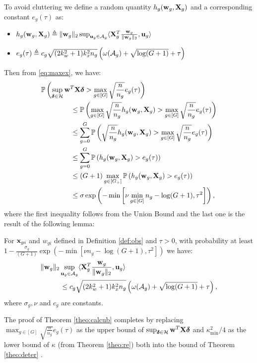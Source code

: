 To avoid cluttering we define a random quantity $h_g(\mathbf{w}_g, \mathbf{X}_g)$ and a corresponding constant $e_g(\tau)$ as: 
{\small\begin{itemize}
	\item $h_g(\w_g, \X_g) \triangleq   \norm{\w_g}{2}  \sup_{\u_g \in \cA_g} \langle \X_g^T \frac{\w_g}{\norm{\w_g}{2}}, \u_g \rangle $
	\item $e_g(\tau) \triangleq  c_g\sqrt{(2k_w^2 + 1)k_x^2n_g} \left(\omega(\cA_g) + \sqrt{\log (G+1)} + \tau \right)$
\end{itemize}}
Then from \eqref{eq:maxex}, we have:
\begin{align}
\nr  
&\pr \left(\sup_{\ddelta \in \cH} \w^T \X\ddelta >  \max_{g \in [G]} \sqrt{\frac{n}{n_g}} e_g(\tau) \right) 
\\ \nr 
&\hspace*{1.5cm}\leq \pr \left(\max_{g \in [G]} \sqrt{\frac{n}{n_g}} h_g(\w_g, \X_g) > \max_{g \in [G]} \sqrt{\frac{n}{n_g}} e_g(\tau) \right) 
\\  \nr 
&\hspace*{1.5cm}\leq \sum_{g=0}^{G} \pr \left(\sqrt{\frac{n}{n_g}} h_g(\w_g, \X_g) >  \max_{g \in [G]}  \sqrt{\frac{n}{n_g}} e_g(\tau) \right)  
\\ \nr 
&\hspace*{1.5cm}\leq \sum_{g=0}^{G} \pr \left( h_g(\w_g, \X_g) >  e_g(\tau) \right)  
\\ \nr 	
&\hspace*{1.5cm}\leq (G+1) \max_{g \in [G_+]} \pr \left(h_g(\w_g, \X_g) > e_g(\tau) \right) 
\\ \nr 
&\hspace*{1.5cm}\leq \sigma \exp\left(-\min\left[\nu  \min_{g \in [G]} n_g - \log (G+1), \tau^2\right]\right), 
\end{align} 
where the first inequality follows from the Union Bound and the last one is the result of the following lemma:
\begin{lemma}
	\label{lemm:mainlem}
	For $\mathbf{x}_{gi}$ and $w_{gi}$ defined in Definition \ref{def:obs} and $\tau > 0$, with probability at least $1 - \frac{\sigma_g}{(G+1)} \exp\left(-\min\left[\nu  n_g - \log (G+1), \tau^2\right]\right) $ we have:
	\begin{align}	\nr 
	&\norm{\w_g}{2} \sup_{\u_g \in \cA_g} \langle \X_g^T \frac{\w_g}{\norm{\w_g}{2}}, \u_g \rangle 
	\\ \nr 
	&\hspace*{1cm}\leq 	c_g \sqrt{(2k_w^2 + 1)k_x^2n_g}  \left(\omega(\cA_g)+\sqrt{\log (G+1)} + \tau \right), \nr
	\end{align}
	where $\sigma_g, \nu$ and $c_g$ are constants.
\end{lemma}	
The proof of Theorem \ref{theo:calcub} completes by replacing $\max_{g \in [G]} \sqrt{\frac{n}{n_g}} e_g(\tau)$ as the upper bound of $\sup_{\ddelta \in \cH} \w^T \X\ddelta$ and $\kappa^2_{\min}/4$ as the lower bound of $\kappa$ (from Theorem \ref{theo:re}) both into the bound of Theorem \ref{theo:deter} . \hfill {\qedsymbol}



